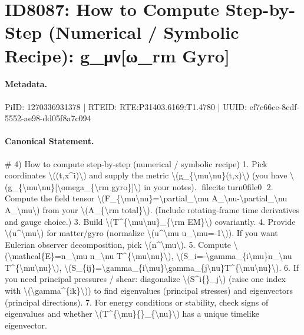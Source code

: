 \section*{ID8087: How to Compute Step-by-Step (Numerical / Symbolic Recipe): g\_μν[ω\_rm Gyro]}
\paragraph{Metadata.}
PiID: 1270336931378 | RTEID: RTE:P31403.6169:T1.4780 | UUID: ef7c66ce-8cdf-5552-ae98-dd05f8a7c094

\paragraph{Canonical Statement.}
\# 4) How to compute step-by-step (numerical / symbolic recipe) 1. Pick coordinates \textbackslash{}((t,x\textasciicircum{}i)\textbackslash{}) and supply the metric \textbackslash{}(g\_\{\textbackslash{}mu\textbackslash{}nu\}(t,x)\textbackslash{}) (you have \textbackslash{}(g\_\{\textbackslash{}mu\textbackslash{}nu\}[\textbackslash{}omega\_\{\textbackslash{}rm gyro\}]\textbackslash{}) in your notes). fileciteturn0file0 2. Compute the field tensor \textbackslash{}(F\_\{\textbackslash{}mu\textbackslash{}nu\}=\textbackslash{}partial\_\textbackslash{}mu A\_\textbackslash{}nu-\textbackslash{}partial\_\textbackslash{}nu A\_\textbackslash{}mu\textbackslash{}) from your \textbackslash{}(A\_\{\textbackslash{}rm total\}\textbackslash{}). (Include rotating-frame time derivatives and gauge choice.) 3. Build \textbackslash{}(T\textasciicircum{}\{\textbackslash{}mu\textbackslash{}nu\}\_\{\textbackslash{}rm EM\}\textbackslash{}) covariantly. 4. Provide \textbackslash{}(u\textasciicircum{}\textbackslash{}mu\textbackslash{}) for matter/gyro (normalize \textbackslash{}(u\textasciicircum{}\textbackslash{}mu u\_\textbackslash{}mu=-1\textbackslash{})). If you want Eulerian observer decomposition, pick \textbackslash{}(n\textasciicircum{}\textbackslash{}mu\textbackslash{}). 5. Compute \textbackslash{}(\textbackslash{}mathcal\{E\}=n\_\textbackslash{}mu n\_\textbackslash{}nu T\textasciicircum{}\{\textbackslash{}mu\textbackslash{}nu\}\textbackslash{}), \textbackslash{}(S\_i=-\textbackslash{}gamma\_\{i\textbackslash{}mu\}n\_\textbackslash{}nu T\textasciicircum{}\{\textbackslash{}mu\textbackslash{}nu\}\textbackslash{}), \textbackslash{}(S\_\{ij\}=\textbackslash{}gamma\_\{i\textbackslash{}mu\}\textbackslash{}gamma\_\{j\textbackslash{}nu\}T\textasciicircum{}\{\textbackslash{}mu\textbackslash{}nu\}\textbackslash{}). 6. If you need principal pressures / shear: diagonalize \textbackslash{}(S\textasciicircum{}i\{\}\_j\textbackslash{}) (raise one index with \textbackslash{}(\textbackslash{}gamma\textasciicircum{}\{ik\}\textbackslash{})) to find eigenvalues (principal stresses) and eigenvectors (principal directions). 7. For energy conditions or stability, check signs of eigenvalues and whether \textbackslash{}(T\textasciicircum{}\{\textbackslash{}mu\}\{\}\_\{\textbackslash{}nu\}\textbackslash{}) has a unique timelike eigenvector.


